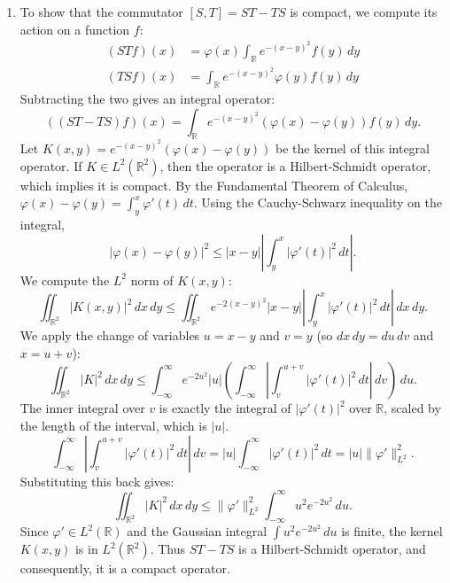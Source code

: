 \documentclass{article}
\begin{document}
\begin{enumerate}[label=\fbox{\arabic*}]
\begin{enumerate}[label=(\arabic*)]
          \item To show that the commutator $[S, T] = ST - TS$ is compact, we compute its action on a function $f$:
          \begin{align*}
            (STf)(x) &= \varphi(x) \int_{\mathbb{R}} e^{-(x-y)^2} f(y) \, dy \\
            (TSf)(x) &= \int_{\mathbb{R}} e^{-(x-y)^2} \varphi(y) f(y) \, dy
          \end{align*}
          Subtracting the two gives an integral operator:
          \[
            ((ST - TS)f)(x) = \int_{\mathbb{R}} e^{-(x-y)^2} (\varphi(x) - \varphi(y)) f(y) \, dy.
          \]
          Let $K(x, y) = e^{-(x-y)^2} (\varphi(x) - \varphi(y))$ be the kernel of this integral operator. If $K \in L^2(\mathbb{R}^2)$, then the operator is a Hilbert-Schmidt operator, which implies it is compact.
          By the Fundamental Theorem of Calculus, $\varphi(x) - \varphi(y) = \int_y^x \varphi'(t) \, dt$. Using the Cauchy-Schwarz inequality on the integral,
          \[
            |\varphi(x) - \varphi(y)|^2 \le |x - y| \left| \int_y^x |\varphi'(t)|^2 \, dt \right|.
          \]
          We compute the $L^2$ norm of $K(x, y)$:
          \[
            \iint_{\mathbb{R}^2} |K(x, y)|^2 \, dx \, dy \le \iint_{\mathbb{R}^2} e^{-2(x-y)^2} |x - y| \left| \int_y^x |\varphi'(t)|^2 \, dt \right| \, dx \, dy.
          \]
          We apply the change of variables $u = x - y$ and $v = y$ (so $dx \, dy = du \, dv$ and $x = u + v$):
          \[
            \iint_{\mathbb{R}^2} |K|^2 \, dx \, dy \le \int_{-\infty}^\infty e^{-2u^2} |u| \left( \int_{-\infty}^\infty \left| \int_v^{u+v} |\varphi'(t)|^2 \, dt \right| \, dv \right) \, du.
          \]
          The inner integral over $v$ is exactly the integral of $|\varphi'(t)|^2$ over $\mathbb{R}$, scaled by the length of the interval, which is $|u|$.
          \[
            \int_{-\infty}^\infty \left| \int_v^{u+v} |\varphi'(t)|^2 \, dt \right| \, dv = |u| \int_{-\infty}^\infty |\varphi'(t)|^2 \, dt = |u| \|\varphi'\|_{L^2}^2.
          \]
          Substituting this back gives:
          \[
            \iint_{\mathbb{R}^2} |K|^2 \, dx \, dy \le \|\varphi'\|_{L^2}^2 \int_{-\infty}^\infty u^2 e^{-2u^2} \, du.
          \]
          Since $\varphi' \in L^2(\mathbb{R})$ and the Gaussian integral $\int u^2 e^{-2u^2} \, du$ is finite, the kernel $K(x, y)$ is in $L^2(\mathbb{R}^2)$. Thus $ST - TS$ is a Hilbert-Schmidt operator, and consequently, it is a compact operator.
        \end{enumerate}


\end{enumerate}
\end{document}
